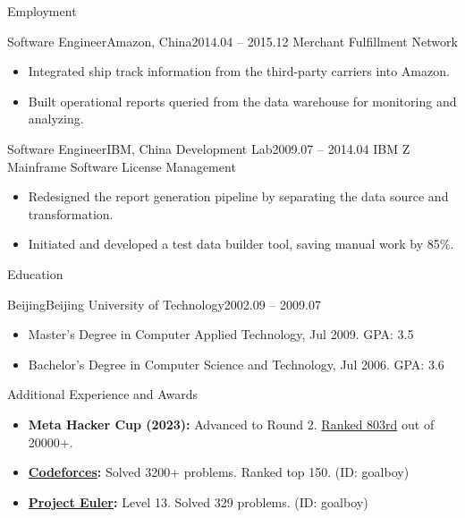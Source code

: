 \documentclass[]{mcdowellcv}
\begin{document}
\begin{cvsection}{Employment}
		\begin{cvsubsection}{Software Engineer}{Amazon, China}{2014.04 – 2015.12}
			Merchant Fulfillment Network
			\begin{itemize}
				\item Integrated ship track information from the third-party carriers into Amazon.
				\item Built operational reports queried from the data warehouse for monitoring and analyzing.
			\end{itemize}
		\end{cvsubsection}
		
		\begin{cvsubsection}{Software Engineer}{IBM, China Development Lab}{2009.07 – 2014.04}
			IBM Z Mainframe Software License Management
			\begin{itemize}
				\item Redesigned the report generation pipeline by separating the data source and transformation.
				\item Initiated and developed a test data builder tool, saving manual work by 85\%.
			\end{itemize}
		\end{cvsubsection}
	\end{cvsection}
	
	\begin{cvsection}{Education}
		\begin{cvsubsection}{Beijing}{Beijing University of Technology}{2002.09 – 2009.07}
			\begin{itemize}
				\item Master's Degree in Computer Applied Technology, Jul 2009. GPA: 3.5
				\item Bachelor's Degree in Computer Science and Technology, Jul 2006. GPA: 3.6
			\end{itemize}
		\end{cvsubsection}
	\end{cvsection}
	
	\begin{cvsection}{Additional Experience and Awards}
		\begin{cvsubsection}{}{}{}
			\begin{itemize}
				\item \textbf{Meta Hacker Cup (2023):} Advanced to Round 2. {\href{https://charles-wangkai.github.io/certificates/certificate_meta_hacker_cup_2023.png}{Ranked 803rd}} out of 20000+.
				\item \textbf{\href{https://codeforces.com}{Codeforces}:} Solved 3200+ problems. Ranked top 150. (ID: goalboy)
				\item \textbf{\href{https://projecteuler.net}{Project Euler}:} Level 13. Solved 329 problems. (ID: goalboy)
			\end{itemize}
		\end{cvsubsection}
	\end{cvsection}
	
\end{document}

